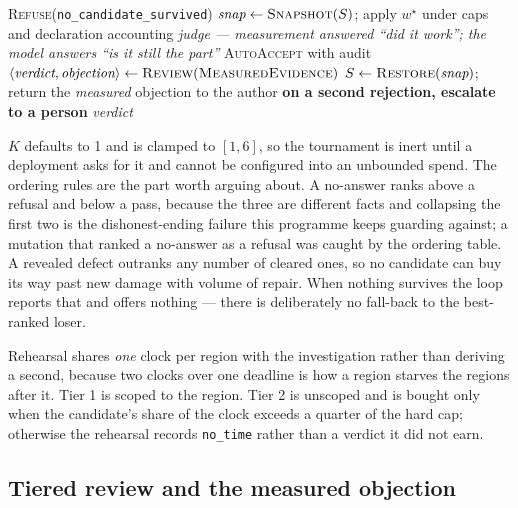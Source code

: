 \documentclass[11pt,onecolumn]{article}
\newcommand{\code}[1]{\texttt{\small #1}}
\begin{document}
\begin{algorithm}[H]
\begin{algorithmic}[1]
\Statex \hfill {}
 \Return \textsc{Refuse}(\code{no\_candidate\_survived}) 
\EndIf
\State $\textit{snap} \gets \textsc{Snapshot}(S)$; apply $w^\star$ under caps and declaration accounting
\Statex \textit{judge --- measurement answered ``did it work''; the model answers ``is it still the part''}
  \State \textsc{AutoAccept} with audit 
\Else
  \State $\langle \textit{verdict}, \textit{objection} \rangle \gets \textsc{Review}(\textsc{MeasuredEvidence})$
  \Statex \hfill {}
    \State $S \gets \textsc{Restore}(\textit{snap})$; return the \emph{measured} objection to the author
    \State \textbf{on a second rejection, escalate to a person} 
  \EndIf
\EndIf
\State \Return \textit{verdict} 
\end{algorithmic}
\end{algorithm}

$K$ defaults to 1 and is clamped to $[1,6]$, so the tournament is inert until a deployment asks for
it and cannot be configured into an unbounded spend. The ordering rules are the part worth arguing
about. A no-answer ranks above a refusal and below a pass, because the three are different facts
and collapsing the first two is the dishonest-ending failure this programme keeps guarding against;
a mutation that ranked a no-answer as a refusal was caught by the ordering table. A revealed defect
outranks any number of cleared ones, so no candidate can buy its way past new damage with volume of
repair. When nothing survives the loop reports that and offers nothing --- there is deliberately no
fall-back to the best-ranked loser.

Rehearsal shares \emph{one} clock per region with the investigation rather than deriving a second,
because two clocks over one deadline is how a region starves the regions after it. Tier 1 is scoped
to the region. Tier 2 is unscoped and is bought only when the candidate's share of the clock
exceeds a quarter of the hard cap; otherwise the rehearsal records \code{no\_time} rather than a
verdict it did not earn.

\subsection{Tiered review and the measured objection}\label{sec:tiered}
\end{document}
